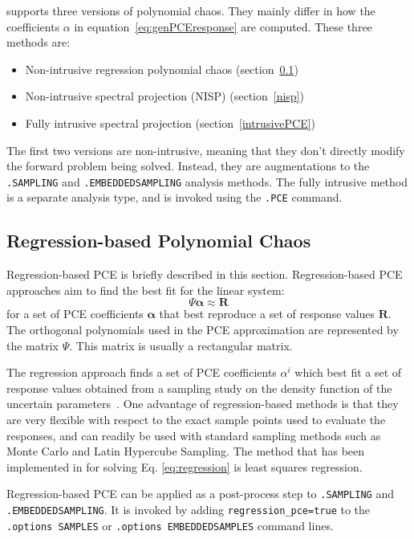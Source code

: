 \Xyce{} supports three versions of polynomial chaos.  They mainly differ in how the coefficients $\alpha$ in equation~\ref{eq:genPCEresponse} are computed.  These three methods are:
\begin{itemize}
  \item Non-intrusive regression polynomial chaos (section~\ref{regressionPCE})
  \item Non-intrusive spectral projection  (NISP) (section~\ref{nisp})
  \item Fully intrusive spectral projection (section~\ref{intrusivePCE})
\end{itemize}
The first two versions are non-intrusive, meaning that they don't directly modify the forward problem being solved.  
Instead, they are augmentations to the \texttt{.SAMPLING} and \texttt{.EMBEDDEDSAMPLING} analysis methods.
The fully intrusive method is a separate analysis type, and is invoked using the \texttt{.PCE} command.
\clearpage
\subsection{Regression-based Polynomial Chaos}
\label{regressionPCE}

Regression-based PCE is briefly described in this section.
Regression-based PCE approaches aim to find the best fit for the linear system:
\begin{equation}
\boldsymbol{\varPsi} \boldsymbol{\alpha} \approx \boldsymbol{R} \label{eq:regression}
\end{equation}
for a set of PCE coefficients $\boldsymbol{\alpha}$ that best
reproduce a set of response values $\boldsymbol{R}$.   The orthogonal polynomials used in the  
PCE approximation are represented by the matrix $\varPsi$.  This matrix is usually a rectangular
matrix.

The regression approach finds a set of PCE coefficients $\alpha^i$ which best fit a set of response
values obtained from a sampling study on the density function of the uncertain 
parameters~\cite{pt_colloc1}.  One advantage of regression-based methods is that
they are very flexible with respect to the exact sample points used to evaluate the responses, 
and can readily be used with standard sampling methods such as Monte Carlo and Latin Hypercube Sampling.
The method that has been implemented in \Xyce{} for solving Eq.
\eqref{eq:regression} is least squares regression.

Regression-based PCE can be applied as a post-process step 
to \texttt{.SAMPLING} and \texttt{.EMBEDDEDSAMPLING}.  It is invoked by adding 
\texttt{regression\_pce=true} to the \texttt{.options SAMPLES} 
or \texttt{.options EMBEDDEDSAMPLES} command lines.  

